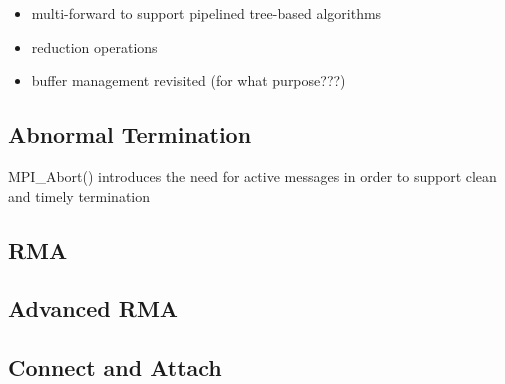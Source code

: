 \begin{itemize}
\item multi-forward to support pipelined tree-based algorithms
\item reduction operations
\item buffer management revisited (for what purpose???)
\end{itemize}


\subsection{Abnormal Termination}

MPI_Abort() introduces the need for active messages in order to support clean
and timely termination


\subsection{RMA}


\subsection{Advanced RMA}


\subsection{Connect and Attach}

